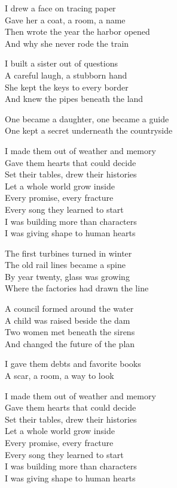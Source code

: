 \begin{lyrics}
I drew a face on tracing paper\\
Gave her a coat, a room, a name\\
Then wrote the year the harbor opened\\
And why she never rode the train

I built a sister out of questions\\
A careful laugh, a stubborn hand\\
She kept the keys to every border\\
And knew the pipes beneath the land

One became a daughter, one became a guide\\
One kept a secret underneath the countryside

I made them out of weather and memory\\
Gave them hearts that could decide\\
Set their tables, drew their histories\\
Let a whole world grow inside\\
Every promise, every fracture\\
Every song they learned to start\\
I was building more than characters\\
I was giving shape to human hearts

The first turbines turned in winter\\
The old rail lines became a spine\\
By year twenty, glass was growing\\
Where the factories had drawn the line

A council formed around the water\\
A child was raised beside the dam\\
Two women met beneath the sirens\\
And changed the future of the plan

I gave them debts and favorite books\\
A scar, a room, a way to look

I made them out of weather and memory\\
Gave them hearts that could decide\\
Set their tables, drew their histories\\
Let a whole world grow inside\\
Every promise, every fracture\\
Every song they learned to start\\
I was building more than characters\\
I was giving shape to human hearts


\end{lyrics}

